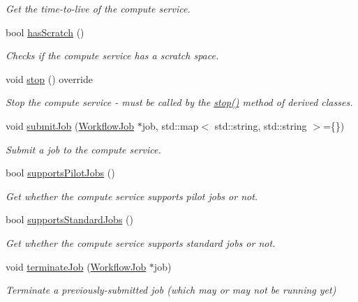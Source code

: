\begin{DoxyCompactItemize}
\begin{DoxyCompactList}\small\item\em Get the time-\/to-\/live of the compute service. \end{DoxyCompactList}\item 
bool \hyperlink{classwrench_1_1_compute_service_a07b64249656b26fef280c1f9db823acf}{has\+Scratch} ()
\begin{DoxyCompactList}\small\item\em Checks if the compute service has a scratch space. \end{DoxyCompactList}\item 
\mbox{\label{classwrench_1_1_compute_service_a289d4a0c5254772575340095b73cf7d4}} 
void \hyperlink{classwrench_1_1_compute_service_a289d4a0c5254772575340095b73cf7d4}{stop} () override
\begin{DoxyCompactList}\small\item\em Stop the compute service -\/ must be called by the \hyperlink{classwrench_1_1_compute_service_a289d4a0c5254772575340095b73cf7d4}{stop()} method of derived classes. \end{DoxyCompactList}\item 
void \hyperlink{classwrench_1_1_compute_service_abc9e51234c29965341727f07b446ff0c}{submit\+Job} (\hyperlink{classwrench_1_1_workflow_job}{Workflow\+Job} $\ast$job, std\+::map$<$ std\+::string, std\+::string $>$=\{\})
\begin{DoxyCompactList}\small\item\em Submit a job to the compute service. \end{DoxyCompactList}\item 
bool \hyperlink{classwrench_1_1_compute_service_acd8cd30b0c6a7f23be2a16e9c8910822}{supports\+Pilot\+Jobs} ()
\begin{DoxyCompactList}\small\item\em Get whether the compute service supports pilot jobs or not. \end{DoxyCompactList}\item 
bool \hyperlink{classwrench_1_1_compute_service_a0f15f4038c447b0f580b9d2a7bf0cd22}{supports\+Standard\+Jobs} ()
\begin{DoxyCompactList}\small\item\em Get whether the compute service supports standard jobs or not. \end{DoxyCompactList}\item 
void \hyperlink{classwrench_1_1_compute_service_aba97c346fb8f171f17ec09681be37d7f}{terminate\+Job} (\hyperlink{classwrench_1_1_workflow_job}{Workflow\+Job} $\ast$job)
\begin{DoxyCompactList}\small\item\em Terminate a previously-\/submitted job (which may or may not be running yet) \end{DoxyCompactList}\end{DoxyCompactItemize}
